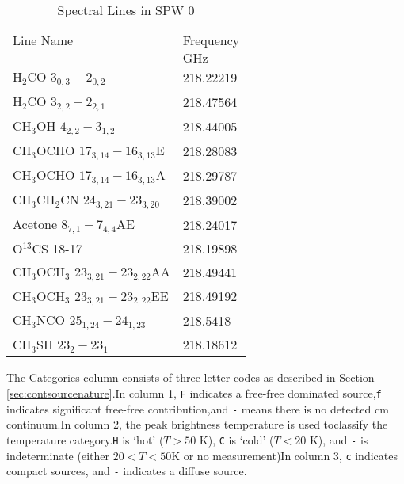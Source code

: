 \begin{table*}[htp]
\caption{Spectral Lines in SPW 0}
\begin{tabular}{ll}
\label{tab:linesspw0}
Line Name & Frequency \\
 & $\mathrm{GHz}$ \\
\hline
H$_2$CO $3_{0,3}-2_{0,2}$ & 218.22219 \\
H$_2$CO $3_{2,2}-2_{2,1}$ & 218.47564 \\
CH$_3$OH $4_{2,2}-3_{1,2}$ & 218.44005 \\
CH$_3$OCHO $17_{3,14}-16_{3,13}$E & 218.28083 \\
CH$_3$OCHO $17_{3,14}-16_{3,13}$A & 218.29787 \\
CH$_3$CH$_2$CN $24_{3,21}-23_{3,20}$ & 218.39002 \\
Acetone $8_{7,1}-7_{4,4}$AE & 218.24017 \\
O$^{13}$CS 18-17 & 218.19898 \\
CH$_3$OCH$_3$ $23_{3,21}-23_{2,22}$AA & 218.49441 \\
CH$_3$OCH$_3$ $23_{3,21}-23_{2,22}$EE & 218.49192 \\
CH$_3$NCO $25_{1,24} - 24_{1,23}$ & 218.5418 \\
CH$_3$SH $23_2-23_1$ & 218.18612 \\
\hline
\end{tabular}
\par
The Categories column consists of three letter codes as described in Section \ref{sec:contsourcenature}.In column 1, \texttt{F} indicates a free-free dominated source,\texttt{f} indicates significant free-free contribution,and \texttt{-} means there is no detected cm continuum.In column 2, the peak brightness temperature is used toclassify the temperature category.\texttt{H} is `hot' ($T>50$ K), \texttt{C} is `cold' ($T<20$ K), and \texttt{-} is indeterminate (either $20<T<50$K or no measurement)In column 3, \texttt{c} indicates compact sources, and \texttt{-} indicates a diffuse source.
\end{table*}
